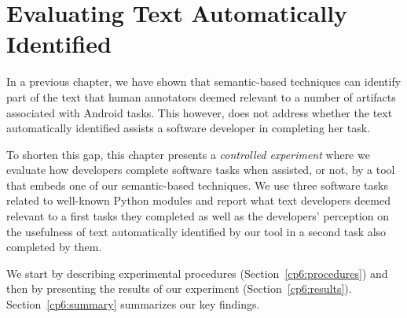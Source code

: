 \setcounter{chapter}{5}
\setcounter{rq}{1}


\chapter{Evaluating Text Automatically Identified}
\label{ch:assisting}



In a previous chapter, we have shown that semantic-based techniques can identify part of the text 
that human annotators deemed relevant to a number of artifacts associated with Android tasks.
This however, does not address whether the text automatically identified assists a software developer
 in completing her task.



To shorten this gap, this chapter presents a \textit{controlled experiment} 
where we evaluate how developers complete software tasks when assisted, or not, by a tool that 
embeds one of our semantic-based techniques. 
We use three software tasks related to well-known Python modules and
report what text  developers deemed relevant to a first tasks they completed
as well as the developers' perception on the usefulness of text automatically
identified by our tool in a second task also completed by them. 


We start by describing experimental procedures (Section~\ref{cp6:procedures}) and then by presenting the results of our experiment (Section~\ref{cp6:results}). Section~\ref{cp6:summary} summarizes our key findings.






